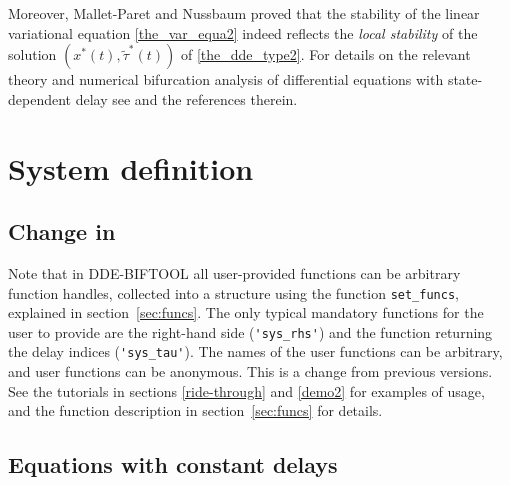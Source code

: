\documentclass[10pt]{scrartcl}
\newcommand{\DDEBIFCODE}{\textsc{DDE-BIFTOOL}}
\newcommand{\blist}[1]{\mbox{\lstinline!#1!}}
\begin{document}

Moreover, Mallet-Paret and Nussbaum \cite{MN11} proved that the
stability of the linear variational equation \eqref{the_var_equa2}
indeed reflects the {\it local stability} of the solution
$(x^*(t),\tilde{\tau}^*(t))$ of \eqref{the_dde_type2}. 
For details on the relevant theory and numerical bifurcation analysis
of differential equations with state-dependent delay see
\cite{luz01,HKWW06} and the references therein.

\section{System definition}\label{sec:system:def}
\subsection{Change in \version} Note that in \DDEBIFCODE{} \version{}
all user-provided functions can be arbitrary function handles,
collected into a structure using the function \blist{set_funcs},
explained in section~\ref{sec:funcs}. The only typical mandatory
functions for the user to provide are the right-hand side
(\blist{'sys_rhs'}) and the function returning the delay indices
(\blist{'sys_tau'}). The names of the user functions can be arbitrary,
and user functions can be anonymous. This is a change from previous
versions. See the tutorials in sections \ref{ride-through} and
\ref{demo2} for examples of usage, and the function description in
section~\ref{sec:funcs} for details.
\subsection{Equations with constant delays}\label{sys_def1}
\end{document}
